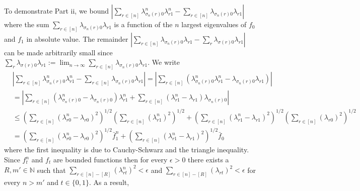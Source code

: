 \documentclass[12pt]{article}
\theoremstyle{definition}
\begin{document}
\begin{flushleft}
To demonstrate Part ii, we bound $\left|\sum_{r \in [n]}\lambda^{n}_{\sigma_{n}(r)0}\lambda^{n}_{r1} - \sum_{r\in[n]}\lambda_{\sigma_{n}(r)0}\lambda_{r1}\right|$ where the sum $\sum_{r\in[n]}\lambda_{\sigma_{n}(r)0}\lambda_{r1}$ is a function of the $n$ largest eigenvalues of $f_{0}$ and $f_{1}$ in absolute value. The remainder $\left|\sum_{r\in[n]}\lambda_{\sigma_{n}(r)0}\lambda_{r1} - \sum_{r}\lambda_{\sigma(r)0}\lambda_{r1}\right|$ can be made arbitrarily small since $\sum_{r}\lambda_{\sigma(r)0}\lambda_{r1} := \lim_{n \to \infty}\sum_{r\in[n]}\lambda_{\sigma_{n}(r)0}\lambda_{r1}$. We write
\begin{align*}
&\left|\sum_{r \in [n]}\lambda^{n}_{\sigma_{n}(r)0}\lambda^{n}_{r1} - \sum_{r\in[n]}\lambda_{\sigma_{n}(r)0}\lambda_{r1}\right|
= \left|\sum_{r \in [n]}\left(\lambda^{n}_{\sigma_{n}(r)0}\lambda^{n}_{r1} - \lambda_{\sigma_{n}(r)0}\lambda_{r1}\right)\right| \\
&= \left|\sum_{r \in [n]}\left(\lambda^{n}_{\sigma_{n}(r)0}-\lambda_{\sigma_{n}(r)0}\right)\lambda^{n}_{r1} + \sum_{r \in [n]}\left(\lambda^{n}_{r1}-\lambda_{r1}\right)\lambda_{\sigma_{n}(r)0}\right| \\
&\leq  \left(\sum_{r \in [n]}\left(\lambda^{n}_{r0}-\lambda_{r0}\right)^{2}\right)^{1/2}\left(\sum_{r \in [n]}\left(\lambda^{n}_{r1}\right)^{2}\right)^{1/2} + \left(\sum_{r \in [n]}\left(\lambda^{n}_{r1}-\lambda_{r1}\right)^{2}\right)^{1/2}\left(\sum_{r \in [n]}\left(\lambda_{r0}\right)^{2}\right)^{1/2} \\
&=  \left(\sum_{r \in [n]}\left(\lambda^{n}_{r0}-\lambda_{r0}\right)^{2}\right)^{1/2}\bar{f}^{n}_{1} + \left(\sum_{r \in [n]}\left(\lambda^{n}_{r1}-\lambda_{r1}\right)^{2}\right)^{1/2}\bar{f}_{0}
\end{align*}
where the first inequality is due to Cauchy-Schwarz and the triangle inequality. Since $f_{t}^{n}$ and $f_{t}$ are  bounded functions then for every $\epsilon > 0$ there exists a $R,m' \in \mathbb{N}$ such that $\sum_{r \in [n]-[R]}\left(\lambda^{n}_{rt}\right)^{2} < \epsilon$ and $\sum_{r \in [n]-[R]}\left(\lambda_{rt}\right)^{2} < \epsilon$ for every $n > m'$ and $t \in \{0,1\}$. As a result, 


\end{flushleft}
\end{document}
